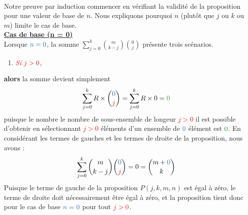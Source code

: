\documentclass[16pt]{report}
\begin{document}
\begin{multicols*}{2}
\begin{Preuve*}{}{}
        \paragraph{}
        Notre preuve par induction commencer en vérifiant la validité de la proposition pour 
        une valeur de base de $n$. Nous expliquons pourquoi $n$ (plutôt que $j$ ou $k$ ou $m$) 
        limite le cas de base. \vspace{1em} \\ 
        \underline{\textbf{Cas de base (n = 0)}}\\
        Lorsque $\textcolor{myb}{n = 0}$, la somme $\sum_{j=0}^{k}{m \choose k-j}{0 \choose j}$ 
        présente trois scénarios. \\ 
        \begin{enumerate}
            \item \textit{\textcolor{red}{Si}} $\textcolor{red}{j > 0}$,
        \end{enumerate}
         \textbf{alors} la somme devient simplement 
        \[ \sum_{j=0}^{k} R \times {\textcolor{myb}{0} \choose \textcolor{red}{j}} = 
        \sum_{j=0}^{k}R \times 0 = \textcolor{myg}{0}\]
        puisque le nombre \textcolor{myg}{le nombre de sous-ensemble} de longeur \textcolor{red}{$j > 0$}
        il est possible d'obtenir en sélectionnant \textcolor{red}{$j > 0$} éléments 
        d'un ensemble de $\textcolor{myb}{0}$  élément est $\textcolor{myg}{0}$. En considérant 
        les termes de gauches et les termes de droite de la proposition, 
        nous avons : 
        \[ \sum_{j=0}^{k} {m \choose k - j}{\textcolor{myb}{0} \choose \textcolor{red}{j}} = 0 
        = {m + \textcolor{myb}{0} \choose k} \]
        Puisque le terme de gauche de la proposition $P(j,k,m,n)$ est égal à zéro, 
        le terme de droite doit nécessairement être égal à zéro, et la proposition 
        tient donc pour le cas de base $\textcolor{myb}{n = 0}$ pour tout $\textcolor{red}{j > 0}$. 


\end{Preuve*}
\end{multicols*}
\end{document}
